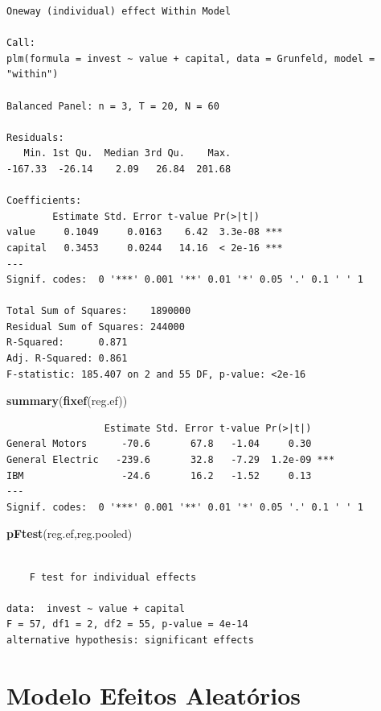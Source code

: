 \documentclass[12pt,brazil,oneside]{book}
\newenvironment{Shaded}{\begin{snugshade}}{\end{snugshade}}
\newcommand{\KeywordTok}[1]{\textcolor[rgb]{0.13,0.29,0.53}{\textbf{#1}}}
\newcommand{\NormalTok}[1]{#1}
\begin{document}
\begin{verbatim}
Oneway (individual) effect Within Model

Call:
plm(formula = invest ~ value + capital, data = Grunfeld, model = "within")

Balanced Panel: n = 3, T = 20, N = 60

Residuals:
   Min. 1st Qu.  Median 3rd Qu.    Max. 
-167.33  -26.14    2.09   26.84  201.68 

Coefficients:
        Estimate Std. Error t-value Pr(>|t|)    
value     0.1049     0.0163    6.42  3.3e-08 ***
capital   0.3453     0.0244   14.16  < 2e-16 ***
---
Signif. codes:  0 '***' 0.001 '**' 0.01 '*' 0.05 '.' 0.1 ' ' 1

Total Sum of Squares:    1890000
Residual Sum of Squares: 244000
R-Squared:      0.871
Adj. R-Squared: 0.861
F-statistic: 185.407 on 2 and 55 DF, p-value: <2e-16
\end{verbatim}

\begin{Shaded}
\begin{Highlighting}[]
\KeywordTok{summary}\NormalTok{(}\KeywordTok{fixef}\NormalTok{(reg.ef))}
\end{Highlighting}
\end{Shaded}

\begin{verbatim}
                 Estimate Std. Error t-value Pr(>|t|)    
General Motors      -70.6       67.8   -1.04     0.30    
General Electric   -239.6       32.8   -7.29  1.2e-09 ***
IBM                 -24.6       16.2   -1.52     0.13    
---
Signif. codes:  0 '***' 0.001 '**' 0.01 '*' 0.05 '.' 0.1 ' ' 1
\end{verbatim}

\begin{Shaded}
\begin{Highlighting}[]
\KeywordTok{pFtest}\NormalTok{(reg.ef,reg.pooled)}
\end{Highlighting}
\end{Shaded}

\begin{verbatim}

    F test for individual effects

data:  invest ~ value + capital
F = 57, df1 = 2, df2 = 55, p-value = 4e-14
alternative hypothesis: significant effects
\end{verbatim}

\hypertarget{modelo-efeitos-aleatorios}{%
\section{Modelo Efeitos Aleatórios}\label{modelo-efeitos-aleatorios}}
\end{document}
